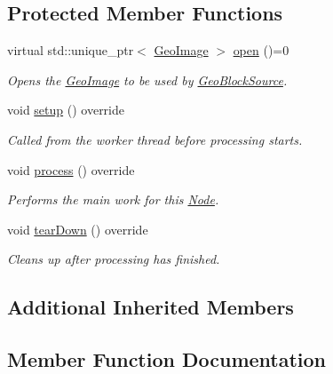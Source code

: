\subsection*{Protected Member Functions}
\begin{DoxyCompactItemize}
\item 
virtual std\+::unique\+\_\+ptr$<$ \hyperlink{classdg_1_1deepcore_1_1imagery_1_1_geo_image}{Geo\+Image} $>$ \hyperlink{classdg_1_1deepcore_1_1imagery_1_1_geo_block_source_ac90d8d3c8fb36493fe5e46e2807acd5c}{open} ()=0
\begin{DoxyCompactList}\small\item\em Opens the \hyperlink{classdg_1_1deepcore_1_1imagery_1_1_geo_image}{Geo\+Image} to be used by \hyperlink{classdg_1_1deepcore_1_1imagery_1_1_geo_block_source}{Geo\+Block\+Source}. \end{DoxyCompactList}\item 
void \hyperlink{classdg_1_1deepcore_1_1imagery_1_1_geo_block_source_a716fcfc4460d2877b0683efc30ecd32f}{setup} () override
\begin{DoxyCompactList}\small\item\em Called from the worker thread before processing starts. \end{DoxyCompactList}\item 
void \hyperlink{classdg_1_1deepcore_1_1imagery_1_1_geo_block_source_a08ec451da8ed96c642509dc2c975aa10}{process} () override
\begin{DoxyCompactList}\small\item\em Performs the main work for this \hyperlink{classdg_1_1deepcore_1_1_node}{Node}. \end{DoxyCompactList}\item 
void \hyperlink{classdg_1_1deepcore_1_1imagery_1_1_geo_block_source_a1a056b8435ab2b73574b5d10e4341b20}{tear\+Down} () override
\begin{DoxyCompactList}\small\item\em Cleans up after processing has finished. \end{DoxyCompactList}\end{DoxyCompactItemize}
\subsection*{Additional Inherited Members}


\subsection{Member Function Documentation}
